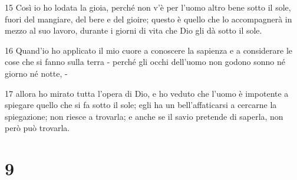 \par 15 Così io ho lodata la gioia, perché non v'è per l'uomo altro bene sotto il sole, fuori del mangiare, del bere e del gioire; questo è quello che lo accompagnerà in mezzo al suo lavoro, durante i giorni di vita che Dio gli dà sotto il sole.
\par 16 Quand'io ho applicato il mio cuore a conoscere la sapienza e a considerare le cose che si fanno sulla terra - perché gli occhi dell'uomo non godono sonno né giorno né notte, -
\par 17 allora ho mirato tutta l'opera di Dio, e ho veduto che l'uomo è impotente a spiegare quello che si fa sotto il sole; egli ha un bell'affaticarsi a cercarne la spiegazione; non riesce a trovarla; e anche se il savio pretende di saperla, non però può trovarla.

\chapter{9}

